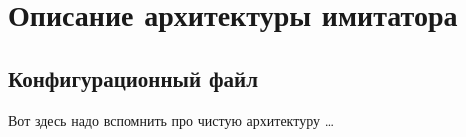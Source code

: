 \chapter{Описание архитектуры имитатора}\label{ch:ch2}

\section{Конфигурационный файл}\label{sec:ch2/sec1}

Вот здесь надо вспомнить про чистую архитектуру \cite{book:clean:clean_arch} \ldots